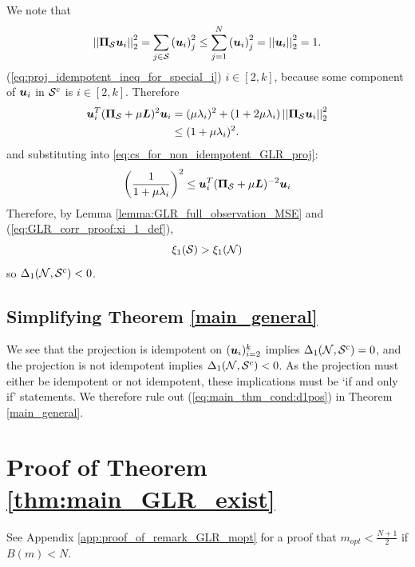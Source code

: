 We note that
\begin{align}
    \sqnormvec{\proj{S}\vect{u}_{i}} = \sum_{j \in \set{S}} \left(\vect{u}_{i}\right)_{j}^{2} \leq \sum_{j =1}^{N} \left(\vect{u}_{i}\right)_{j}^{2} = \sqnormvec{\vect{u}_{i}} = 1. \label{eq:proj_idempotent_ineq_for_special_i}
\end{align}
 (\ref{eq:proj_idempotent_ineq_for_special_i})  $i\in [2,k]$, because some component of $\bm{u}_{i}$ in $\mathcal{S}^{c}$ is  $i \in [2,k]$. Therefore
\begin{align}
    \vect{u}_{i}^{T}(\proj{S} + \mu \matr{L})^{2}\vect{u}_{i} &= (\mu\lambda_{i})^{2} + (1 + 2\mu\lambda_{i}) \sqnormvec{\proj{S}\vect{u}_{i}} \\
    &\leq (1 + \mu\lambda_{i})^{2}.
\end{align}
and substituting into \eqref{eq:cs_for_non_idempotent_GLR_proj}:
\begin{align}
    \left(\frac{1}{1 + \mu\lambda_{i}}\right)^{2} \leq \vect{u}_{i}^{T}(\proj{S} + \mu \matr{L})^{-2}\vect{u}_{i}
\end{align}
 Therefore, by Lemma \ref{lemma:GLR_full_observation_MSE} and (\ref{eq:GLR_corr_proof:xi_1_def}),
\begin{equation}
    \xi_{1}(\mathcal{S}) > \xi_{1}(\mathcal{N})
\end{equation}
so $\Delta_{1}(\mathcal{N},\mathcal{S}^{c}) < 0$.


\subsection{Simplifying Theorem \ref{main_general}}
We see that the projection is idempotent on $(\bm{u}_{i})_{i=2}^{k}$ implies $\Delta_{1}(\mathcal{N},\mathcal{S}^{c}) = 0$, and the projection is not idempotent implies $\Delta_{1}(\mathcal{N},\mathcal{S}^{c}) < 0$. As the projection must either be idempotent or not idempotent, these implications must be `if and only if' statements. We therefore rule out (\ref{eq:main_thm_cond:d1pos}) in Theorem \ref{main_general}. 

\section{Proof of Theorem \ref{thm:main_GLR_exist}}
\label{app:Proof_thm_main_GLR_exist}
\noindent See Appendix \ref{app:proof_of_remark_GLR_mopt} for a proof that $ m_{opt} < \frac{N+1}{2}$ if $B(m)<N$.

